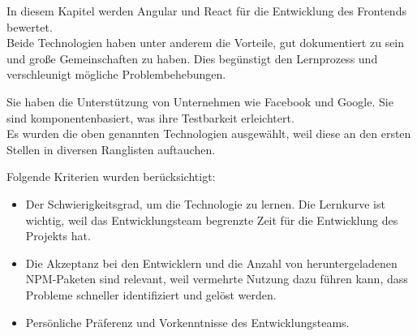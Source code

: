 \begin{flushleft}
In diesem Kapitel werden Angular und React für die Entwicklung des Frontends bewertet. 
\\
Beide Technologien haben unter anderem die Vorteile, gut dokumentiert zu sein und große Gemeinschaften zu haben. Dies begünstigt den Lernprozess und verschleunigt mögliche Problembehebungen.

\begin{flushleft}
Sie haben die Unterstützung von Unternehmen wie Facebook und Google. Sie sind komponentenbasiert, was ihre Testbarkeit erleichtert.
\\
Es wurden die oben genannten Technologien ausgewählt, weil diese an den ersten Stellen in diversen Ranglisten auftauchen{\cite{SO01}}.
\end{flushleft}

  Folgende Kriterien wurden berücksichtigt:
  \begin{itemize}
    \item
          Der Schwierigkeitsgrad, um die Technologie zu lernen. 
          Die Lernkurve ist wichtig, weil das Entwicklungsteam begrenzte Zeit für die Entwicklung des Projekts hat. 


    \item
          Die Akzeptanz bei den Entwicklern und die Anzahl von heruntergeladenen NPM-Paketen sind relevant, weil vermehrte Nutzung dazu führen kann, dass Probleme schneller identifiziert und gelöst werden.{\cite{LIN1}}

          
      
    \item
          Persönliche Präferenz und Vorkenntnisse des Entwicklungsteams. 
  \end{itemize}

\end{flushleft}

